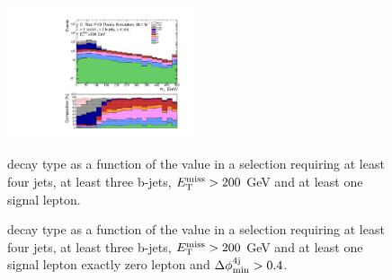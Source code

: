 \begin{figure}[h!]
\centering 
\includegraphics[width=0.49\textwidth]{figures/susy_common/mc_stack_mT_1L_3b_tt_dec.pdf}
\caption{\ttbar decay type as a function of the \mt value  in a selection requiring at least four jets, at least three b-jets, $E_{\rm T}^{\mathrm{miss}}>200$ GeV and at least one signal lepton.}\label{fig:ttbar_decay_mT_1L}

\caption{\ttbar decay type as a function of the \mtb value  in a selection requiring at least four jets, at least three b-jets, $E_{\rm T}^{\mathrm{miss}}>200$ GeV and  at least one signal lepton  exactly zero lepton and $\Delta\phi_{\rm{min}}^{4{\rm{j}}} > 0.4$.}\label{fig:ttbar_decay_mTb_min}
\end{figure}

